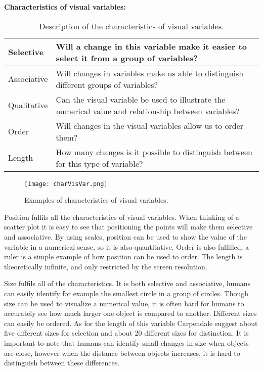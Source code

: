 \textbf{Characteristics of visual variables:}
\begin{table}[h!]
  \begin{tabular}{|l|p{10cm}|}
      \hline
      Selective   & Will a change in this variable make it easier to select it from a group of variables? \\ \hline
        Associative & Will changes in variables make us able to distinguish different groups of variables? \\ \hline 
        Qualitative & Can the visual variable be used to illustrate the numerical value and relationship between variables? \\ \hline
        Order       & Will changes in the visual variables allow us to order them? \\ \hline
        Length      & How many changes is it possible to distinguish between for this type of variable? \\ \hline
    \end{tabular}
    \caption{Description of the characteristics of visual variables.}
\end{table}

\begin{figure}[h!]
	\centering
		\texttt{[image: charVisVar.png]}
		\caption[Characteristics of visual variables]{Examples of characteristics of visual variables.}
		\label{fig:charVisVar}
\end{figure}

Position fulfils all the characteristics of visual variables. When thinking of a scatter plot it is easy to see that positioning the points will make them selective and associative. By using scales, position can be used to show the value of the variable in a numerical sense, so it is also quantitative. Order is also fulfilled, a ruler is a simple example of how position can be used to order. The length is theoretically infinite, and only restricted by the screen resolution.

Size fulfils all of the characteristics. It is both selective and associative, humans can easily identify for example the smallest circle in a group of circles. Though size can be used to visualize a numerical value, it is often hard for humans to accurately see how much larger one object is compared to another. Different sizes can easily be ordered. As for the length of this variable Carpendale suggest about five different sizes for selection and about 20 different sizes for distinction. It is important to note that humans can identify small changes in size when objects are close, however when the distance between objects increases, it is hard to distinguish between these differences.

